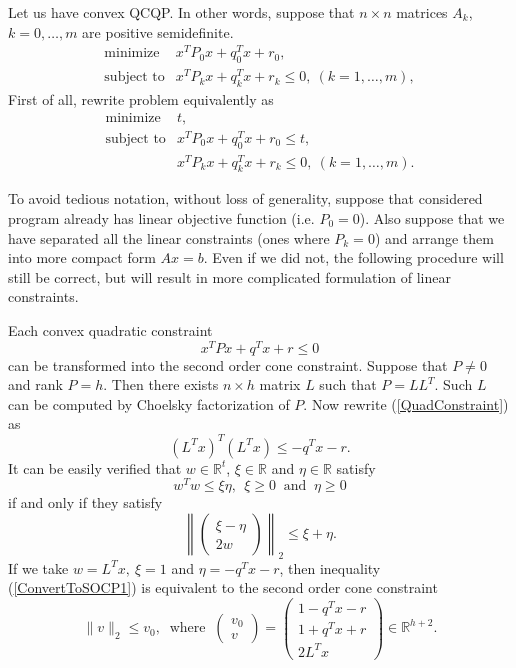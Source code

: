 \documentclass[12pt]{book}
\theoremstyle{definition}
\begin{document}
Let us have convex QCQP. In other words, suppose that $n\times n$ matrices $A_k$, $k=0,\dots ,m$ are positive semidefinite. 
\begin{equation}
\begin{array}{ll}
\mbox{minimize}& x^TP_0x + q_0^Tx + r_0, \\
\mbox{subject to}& x^TP_kx + q_k^Tx + r_k \leq 0, \  (k = 1,\dots ,m),
\end{array} 
\end{equation}
First of all, rewrite problem equivalently as
\begin{equation}
\begin{array}{ll}
\mbox{minimize}& t, \\
\mbox{subject to} & x^TP_0x + q_0^Tx + r_0 \leq t,\\
& x^TP_kx + q_k^Tx + r_k \leq 0, \  (k = 1,\dots ,m).
\end{array} 
\end{equation}

To avoid tedious notation, without loss of generality, suppose that considered program already has linear objective function (i.e. $P_0 = 0$).  Also suppose that we have separated all the linear constraints (ones where $P_k = 0$) and arrange them into more compact form $Ax=b$. Even if we did not, the following procedure will still be correct, but will result in more complicated formulation of linear constraints.

Each convex quadratic constraint 
\begin{equation}
\label{QuadConstraint}
x^TPx + q^Tx + r \leq 0
\end{equation} 
can be transformed into the second order cone constraint.  Suppose that $P\neq 0$ and rank $P = h.$ Then there exists $n\times h$ matrix $L$ such that $P=LL^T$. Such $L$ can be computed by Choelsky factorization of $P$. Now rewrite (\ref{QuadConstraint}) as 
\begin{equation}
\label{ConvertToSOCP1}
(L^Tx)^T(L^Tx)\leq -q^Tx - r.
\end{equation}
It can be easily verified that $w\in \mathbb{R}^t$, $\xi \in \mathbb{R}$ and $\eta \in \mathbb{R}$ satisfy
$$w^Tw\leq \xi\eta, \ \ \xi\geq 0\ \mbox{ and } \ \eta\geq 0$$
if and only if they satisfy
$$\left\|\left( \begin{array}{c}
\xi-\eta\\
2w
\end{array}\right)\right\|_2
\leq \xi+\eta . $$
If we take $w=L^Tx, \ \xi = 1$ and $\eta = -q^Tx - r$, then inequality (\ref{ConvertToSOCP1}) is equivalent to the second order cone constraint
\begin{equation}
\label{ConvertedQCintoSOCC}
 \|v\|_2\leq v_0, \ \mbox{  where  } \ \left(\begin{array}{c}
v_0\\
v
\end{array}\right) = 
\left(\begin{array}{c}
1- q^Tx - r\\
1 + q^Tx + r\\
2L^Tx
\end{array}\right)\in \mathbb{R}^{h+2}.
\end{equation}
\end{document}

